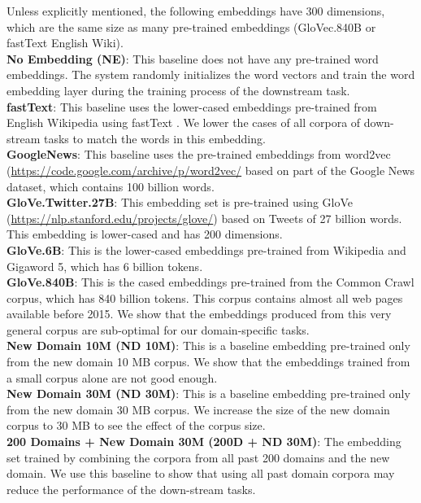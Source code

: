 Unless explicitly mentioned, the following embeddings have 300 dimensions, which are the same size as many pre-trained embeddings (GloVec.840B \cite{pennington2014glove} or fastText English Wiki\cite{bojanowski2016enriching}).\\
\textbf{No Embedding (NE)}: This baseline does not have any pre-trained word embeddings. The system randomly initializes the word vectors and train the word embedding layer during the training process of the downstream task.
\\
\textbf{fastText}: This baseline uses the lower-cased embeddings pre-trained from English Wikipedia using fastText \cite{bojanowski2016enriching}. We lower the cases of all corpora of down-stream tasks to match the words in this embedding. \\
\textbf{GoogleNews}: This baseline uses the pre-trained embeddings from word2vec (\url{https://code.google.com/archive/p/word2vec/} based on part of the Google News dataset, which contains 100 billion words.\\
\textbf{GloVe.Twitter.27B}: This embedding set is pre-trained using GloVe (\url{https://nlp.stanford.edu/projects/glove/}) based on Tweets of 27 billion words. This embedding is lower-cased and has 200 dimensions.\\
\textbf{GloVe.6B}: This is the lower-cased embeddings pre-trained from Wikipedia and Gigaword 5, which has 6 billion tokens. \\
\textbf{GloVe.840B}: This is the cased embeddings pre-trained from the Common Crawl corpus, which has 840 billion tokens.
This corpus contains almost all web pages available before 2015. 
We show that the embeddings produced from this very general corpus are sub-optimal for our domain-specific tasks.\\
\textbf{New Domain 10M (ND 10M)}: This is a baseline embedding pre-trained only from the new domain 10 MB corpus. 
We show that the embeddings trained from a small corpus alone are not good enough.\\
\textbf{New Domain 30M (ND 30M)}: This is a baseline embedding pre-trained only from the new domain 30 MB corpus. We increase the size of the new domain corpus to 30 MB to see the effect of the corpus size. \\
\textbf{200 Domains + New Domain 30M (200D + ND 30M)}: The embedding set trained by combining the corpora from all past 200 domains and the new domain. We use this baseline to show that using all past domain corpora may reduce the performance of the down-stream tasks. \\
